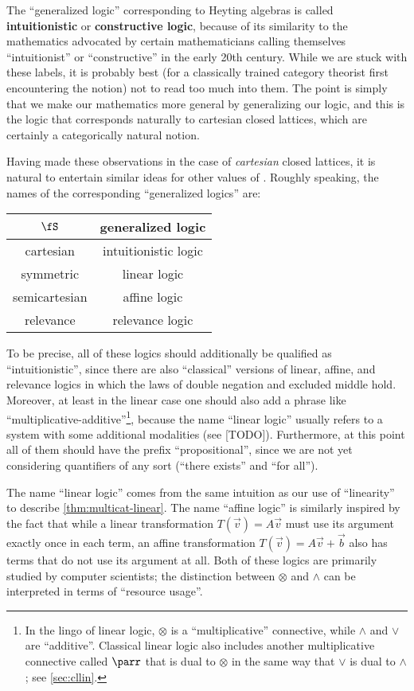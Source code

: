 \documentclass{book}
\let\meet\wedge
\let\join\vee
\let\tensor\otimes
\begin{document}
The ``generalized logic'' corresponding to Heyting algebras is called \textbf{intuitionistic} or \textbf{constructive logic}, because of its similarity to the mathematics advocated by certain mathematicians calling themselves ``intuitionist'' or ``constructive'' in the early 20th century.
While we are stuck with these labels, it is probably best (for a classically trained category theorist first encountering the notion) not to read too much into them.
The point is simply that we make our mathematics more general by generalizing our logic, and this is the logic that corresponds naturally to cartesian closed lattices, which are certainly a categorically natural notion.

Having made these observations in the case of \emph{cartesian} closed lattices, it is natural to entertain similar ideas for other values of \fS.
Roughly speaking, the names of the corresponding ``generalized logics'' are:
\begin{center}
\begin{tabular}{c|c}
  $\fS$ & generalized logic\\\hline
  cartesian & intuitionistic logic\\
  symmetric & linear logic\\
  semicartesian & affine logic\\
  relevance & relevance logic
\end{tabular}
\end{center}
To be precise, all of these logics should additionally be qualified as ``intuitionistic'', since there are also ``classical'' versions of linear, affine, and relevance logics in which the laws of double negation and excluded middle hold.
Moreover, at least in the linear case one should also add a phrase like ``multiplicative-additive''\footnote{In the lingo of linear logic, $\tensor$ is a ``multiplicative'' connective, while $\meet$ and $\join$ are ``additive''.
  Classical linear logic also includes another multiplicative connective called $\parr$ that is dual to $\tensor$ in the same way that $\join$ is dual to $\meet$; see \cref{sec:cllin}.}, because the name ``linear logic'' usually refers to a system with some additional modalities (see [TODO]).
Furthermore, at this point all of them should have the prefix ``propositional'', since we are not yet considering quantifiers of any sort (``there exists'' and ``for all'').

The name ``linear logic'' comes from the same intuition as our use of ``linearity'' to describe \cref{thm:multicat-linear}.
The name ``affine logic'' is similarly inspired by the fact that while a linear transformation $T(\vec v) = A\vec v$ must use its argument exactly once in each term, an affine transformation $T(\vec v) = A\vec v + \vec b$ also has terms that do not use its argument at all.
Both of these logics are primarily studied by computer scientists; the distinction between $\tensor$ and $\meet$ can be interpreted in terms of ``resource usage''.
\end{document}
